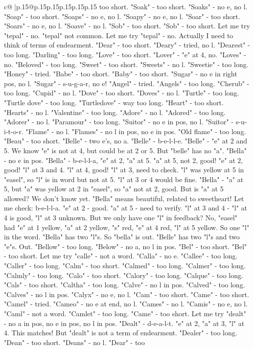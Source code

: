 \documentclass{article}
\begin{document}
{\begin{supertabular}{c@{$\;$}|p{.15\linewidth}@{}p{.15\linewidth}p{.15\linewidth}p{.15\linewidth}p{.15\linewidth}p{.15\linewidth}}
{{{too short. "Soak" {-} too short. "Soaks" {-} no e, no l. "Soap" {-} too short. "Soaps" {-} no e, no l. "Soapy" {-} no e, no l. "Soar" {-} too short. "Soars" {-} no e, no l. "Soave" {-} no l. "Sob" {-} too short. "Sob" {-} too short. Let me try "tepal" {-} no. "tepal" not common. Let me try "tepal" {-} no. Actually I need to think of terms of endearment. "Dear" {-} too short. "Deary" {-} tried, no l. "Dearest" {-} too long. "Darling" {-} too long. "Love" {-} too short. "Lover" {-} "e" at 4, no. "Loves" {-} no. "Beloved" {-} too long. "Sweet" {-} too short. "Sweets" {-} no l. "Sweetie" {-} too long. "Honey" {-} tried. "Babe" {-} too short. "Baby" {-} too short. "Sugar" {-} no e in right pos, no l. "Sugar" {-} s{-}u{-}g{-}a{-}r, no e! "Angel" {-} tried. "Angels" {-} too long. "Cherub" {-} too long. "Cupid" {-} no l. "Dove" {-} too short. "Doves" {-} no l. "Turtle" {-} too long. "Turtle dove" {-} too long. "Turtledove" {-} way too long. "Heart" {-} too short. "Hearts" {-} no l. "Valentine" {-} too long. "Adore" {-} no l. "Adored" {-} too long. "Adorer" {-} no l. "Paramour" {-} too long. "Suitor" {-} no e in pos, no l. "Suitor" {-} s{-}u{-}i{-}t{-}o{-}r. "Flame" {-} no l. "Flames" {-} no l in pos, no e in pos. "Old flame" {-} too long. "Beau" {-} too short. "Belle" {-} two e's, no a. "Belle" {-} b{-}e{-}l{-}l{-}e. "Belle" {-} "e" at 2 and 5. We know "e" is not at 4, but could be at 2 or 5. But "belle" has no "a". "Bella" {-} no e in pos. "Bella" {-} b{-}e{-}l{-}l{-}a, "e" at 2, "a" at 5. "a" at 5, not 2, good! "e" at 2, good! "l" at 3 and 4. "l" at 4, good! "l" at 3, need to check. "l" was yellow at 5 in "easel", so "l" is in word but not at 5. "l" at 3 or 4 would be fine. "Bella" {-} "a" at 5, but "a" was yellow at 2 in "easel", so "a" not at 2, good. But is "a" at 5 allowed? We don't know yet. "Bella" means beautiful, related to sweetheart! Let me check: b{-}e{-}l{-}l{-}a. "e" at 2 {-} good. "a" at 5 {-} need to verify. "l" at 3 and 4 {-} "l" at 4 is good, "l" at 3 unknown. But we only have one "l" in feedback? No, "easel" had "e" at 1 yellow, "a" at 2 yellow, "s" red, "e" at 4 red, "l" at 5 yellow. So one "l" in the word. "Bella" has two "l"s. So "bella" is out. "Belle" has two "l"s and two "e"s. Out. "Bellow" {-} too long. "Below" {-} no a, no l in pos. "Bel" {-} too short. "Bel" {-} too short. Let me try "calle" {-} not a word. "Calla" {-} no e. "Callee" {-} too long. "Caller" {-} too long. "Calm" {-} too short. "Calmed" {-} too long. "Calmer" {-} too long. "Calmly" {-} too long. "Calo" {-} too short. "Calory" {-} too long. "Calque" {-} too long. "Cals" {-} too short. "Caltha" {-} too long. "Calve" {-} no l in pos. "Calved" {-} too long. "Calves" {-} no l in pos. "Calyx" {-} no e, no l. "Cam" {-} too short. "Came" {-} too short. "Camel" {-} tried. "Cameo" {-} no e at end, no l. "Cames" {-} no l. "Camis" {-} no e, no l. "Caml" {-} not a word. "Camlet" {-} too long. "Came" {-} too short. Let me try "dealt" {-} no a in pos, no e in pos, no l in pos. "Dealt" {-} d{-}e{-}a{-}l{-}t. "e" at 2, "a" at 3, "l" at 4. This matches! But "dealt" is not a term of endearment. "Dealer" {-} too long. "Dean" {-} too short. "Deans" {-} no l. "Dear" {-} too }}}
\end{supertabular}}
\end{document}
